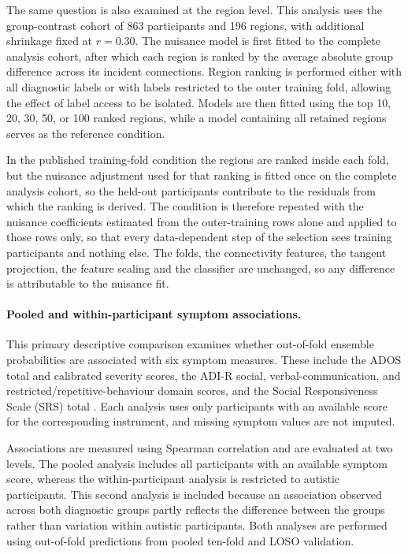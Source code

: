 The same question is also examined at the region level. This analysis uses the group-contrast cohort of 863 participants and 196 regions, with additional shrinkage fixed at $r=0.30$. The nuisance model is first fitted to the complete analysis cohort, after which each region is ranked by the average absolute group difference across its incident connections. Region ranking is performed either with all diagnostic labels or with labels restricted to the outer training fold, allowing the effect of label access to be isolated. Models are then fitted using the top 10, 20, 30, 50, or 100 ranked regions, while a model containing all retained regions serves as the reference condition.

In the published training-fold condition the regions are ranked inside each fold, but the nuisance adjustment used for that ranking is fitted once on the complete analysis cohort, so the held-out participants contribute to the residuals from which the ranking is derived. The condition is therefore repeated with the nuisance coefficients estimated from the outer-training rows alone and applied to those rows only, so that every data-dependent step of the selection sees training participants and nothing else. The folds, the connectivity features, the tangent projection, the feature scaling and the classifier are unchanged, so any difference is attributable to the nuisance fit.

\paragraph{\textbf{Pooled and within-participant symptom associations.}}
\label{par:symptom-associations}
This primary descriptive comparison examines whether out-of-fold ensemble probabilities are associated with six symptom measures. These include the ADOS total and calibrated severity scores, the ADI-R social, verbal-communication, and restricted/repetitive-behaviour domain scores, and the Social Responsiveness Scale (SRS) total \citep{Lordetal1994}. Each analysis uses only participants with an available score for the corresponding instrument, and missing symptom values are not imputed.

Associations are measured using Spearman correlation and are evaluated at two levels. The pooled analysis includes all participants with an available symptom score, whereas the within-participant analysis is restricted to autistic participants. This second analysis is included because an association observed across both diagnostic groups partly reflects the difference between the groups rather than variation within autistic participants. Both analyses are performed using out-of-fold predictions from pooled ten-fold and LOSO validation.



